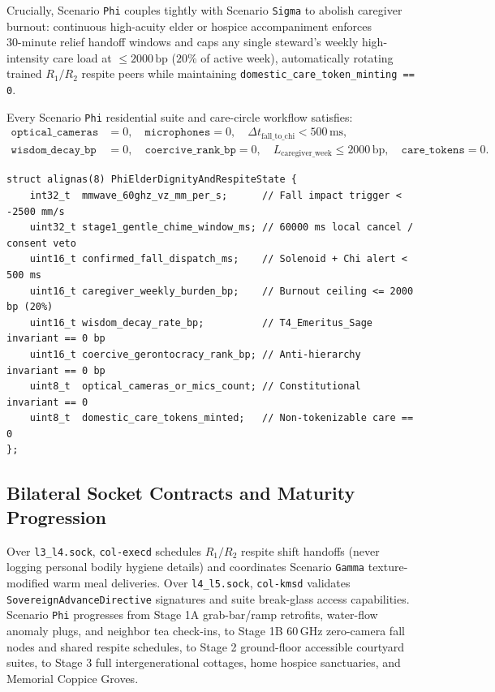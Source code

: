Crucially, Scenario \texttt{Phi} couples tightly with Scenario \texttt{Sigma} to abolish caregiver burnout: continuous high-acuity elder or hospice
accompaniment enforces $30\text{-minute}$ relief handoff windows and caps any single steward's weekly high-intensity care load at
$\le 2000\,\mathrm{bp}$ ($20\%$ of active week), automatically rotating trained $R_1/R_2$ respite peers while maintaining
\texttt{domestic\_care\_token\_minting == 0}.

\begin{invariant}
\label{inv:phi-elder}
Every Scenario \texttt{Phi} residential suite and care-circle workflow satisfies:
\begin{align}
\mathtt{optical\_cameras} &= 0, \quad \mathtt{microphones} = 0, \quad \Delta t_{\mathrm{fall\_to\_chi}} < 500\,\mathrm{ms}, \\
\mathtt{wisdom\_decay\_bp} &= 0, \quad \mathtt{coercive\_rank\_bp} = 0, \quad L_{\mathrm{caregiver\_week}} \le 2000\,\mathrm{bp}, \quad \mathtt{care\_tokens} = 0.
\end{align}
\end{invariant}

\begin{lstlisting}[caption={Scenario \texttt{Phi} Zero-Camera $60\,\mathrm{GHz}$ Fall Escalation, Sage Standing, and Respite Structs},label={lst:phi-structs}]
struct alignas(8) PhiElderDignityAndRespiteState {
    int32_t  mmwave_60ghz_vz_mm_per_s;      // Fall impact trigger < -2500 mm/s
    uint32_t stage1_gentle_chime_window_ms; // 60000 ms local cancel / consent veto
    uint16_t confirmed_fall_dispatch_ms;    // Solenoid + Chi alert < 500 ms
    uint16_t caregiver_weekly_burden_bp;    // Burnout ceiling <= 2000 bp (20%)
    uint16_t wisdom_decay_rate_bp;          // T4_Emeritus_Sage invariant == 0 bp
    uint16_t coercive_gerontocracy_rank_bp; // Anti-hierarchy invariant == 0 bp
    uint8_t  optical_cameras_or_mics_count; // Constitutional invariant == 0
    uint8_t  domestic_care_tokens_minted;   // Non-tokenizable care == 0
};
\end{lstlisting}

\subsection{Bilateral Socket Contracts and Maturity Progression}

Over \texttt{l3\_l4.sock}, \texttt{col-execd} schedules $R_1/R_2$ respite shift handoffs (never logging personal bodily hygiene details) and coordinates
Scenario \texttt{Gamma} texture-modified warm meal deliveries. Over \texttt{l4\_l5.sock}, \texttt{col-kmsd} validates \texttt{SovereignAdvanceDirective}
signatures and suite break-glass access capabilities. Scenario \texttt{Phi} progresses from Stage 1A grab-bar/ramp retrofits, water-flow anomaly plugs,
and neighbor tea check-ins, to Stage 1B $60\,\mathrm{GHz}$ zero-camera fall nodes and shared respite schedules, to Stage 2 ground-floor accessible
courtyard suites, to Stage 3 full intergenerational cottages, home hospice sanctuaries, and Memorial Coppice Groves.


